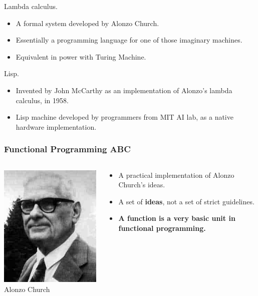 \documentclass[12pt,hyperref=true,mathserif]{beamer}
\begin{document}
\begin{frame}
  Lambda calculus.
  \begin{itemize}
  \item A formal system developed by Alonzo Church.
  \item Essentially a programming language for one of those imaginary
    machines.
  \item Equivalent in power with Turing Machine.
  \end{itemize}
  Lisp.
  \begin{itemize}
  \item Invented by John McCarthy as an implementation of Alonzo's
    lambda calculus, in 1958.
  \item Lisp machine developed by programmers from MIT AI lab, as a
    native hardware implementation.
  \end{itemize}
\end{frame}

\begin{frame}
  \frametitle{Functional Programming ABC}
  \begin{columns}
    \begin{column}{0.5\textwidth}
      \includegraphics[scale=0.4]{Figure/Alonzo_Church.jpg}\\
      Alonzo Church
    \end{column}
    \begin{column}{0.5\textwidth}
      \begin{itemize}
      \item A practical implementation of Alonzo Church's ideas.
      \item A set of \textbf{ideas}, not a set of strict
        guidelines.
      \item \textbf{A function is a very basic unit in
          functional programming.}
      \end{itemize}
    \end{column}
  \end{columns}
\end{frame}
\end{document}
